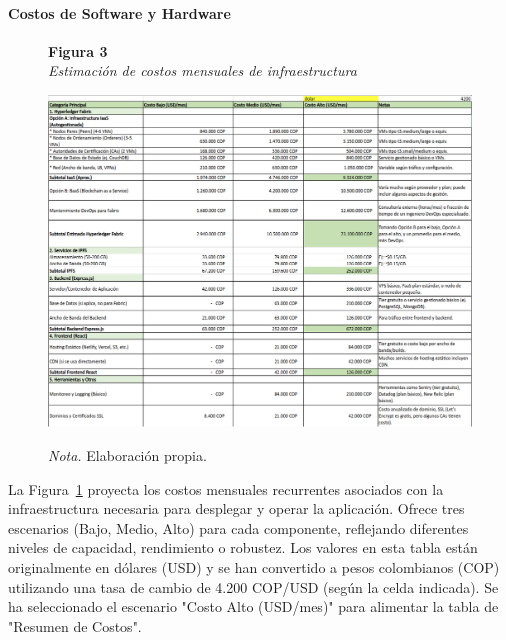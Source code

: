 \paragraph{Costos de Software y Hardware}

\begin{figure}[htbp]
    \begin{flushleft}
        \textbf{Figura 3}\\[2em]
        \textit{Estimación de costos mensuales de infraestructura}
    \end{flushleft}
    \vspace{1em}
    \centering
    \includegraphics[width=\textwidth]{Images/costos2.png}
    \vspace{2em}
    \begin{flushleft}
        \textit{Nota.} Elaboración propia.
    \end{flushleft}
    \label{fig:costos2}
\end{figure}

La Figura~\ref{fig:costos2} proyecta los costos mensuales recurrentes asociados con la infraestructura necesaria para desplegar y operar la aplicación. Ofrece tres escenarios (Bajo, Medio, Alto) para cada componente, reflejando diferentes niveles de capacidad, rendimiento o robustez. Los valores en esta tabla están originalmente en dólares (USD) y se han convertido a pesos colombianos (COP) utilizando una tasa de cambio de 4.200 COP/USD (según la celda indicada). Se ha seleccionado el escenario "Costo Alto (USD/mes)" para alimentar la tabla de "Resumen de Costos". 

